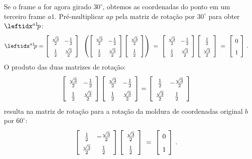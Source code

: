 Se o frame $a$ for agora girado $30^{\circ}$, obtemos as coordenadas do ponto em um terceiro frame $a1$. Pré-multiplicar $ap$ pela matriz de rotação por $30^{\circ}$ para obter $\aprimep$:
\[
\spacearray
\aprimep = \left[\begin{array}{cc}\frac{\sqrt{3}}{2}&-\frac{1}{2}\\\frac{1}{2}&\frac{\sqrt{3}}{2}\end{array}\right]\;\;
\left(\left[\begin{array}{cc}\frac{\sqrt{3}}{2}&-\frac{1}{2}\\\frac{1}{2}&\frac{\sqrt{3}}{2}\end{array}\right]
\left[\begin{array}{c}\frac{\sqrt{3}}{2}\\\frac{1}{2}\end{array}\right]\right)\;=\;
\left[\begin{array}{cc}\frac{\sqrt{3}}{2}&-\frac{1}{2}\\\frac{1}{2}&\frac{\sqrt{3}}{2}\end{array}\right]
\left[\begin{array}{c}\frac{1}{2}\\\frac{\sqrt{3}}{2}\end{array}\right]\;=\;
\left[\begin{array}{c}0\\1\end{array}\right]\,.
\]
O produto das duas matrizes de rotação:
\[
\spacearray
\left[\begin{array}{cc}\frac{\sqrt{3}}{2}&-\frac{1}{2}\\\frac{1}{2}&\frac{\sqrt{3}}{2}\end{array}\right]
\left[\begin{array}{cc}\frac{\sqrt{3}}{2}&-\frac{1}{2}\\\frac{1}{2}&\frac{\sqrt{3}}{2}\end{array}\right]=
\left[\begin{array}{cc}\frac{1}{2}&-\frac{\sqrt{3}}{2}\\\frac{\sqrt{3}}{2}&\frac{1}{2}\end{array}\right]
\]
resulta na matriz de rotação para a rotação da moldura de coordenadas original $b$ por $60^{\circ}$:
\[
\spacearray
\left[\begin{array}{cc}\frac{1}{2}&-\frac{\sqrt{3}}{2}\\\frac{\sqrt{3}}{2}&\frac{1}{2}\end{array}\right]
\left[\begin{array}{c}\frac{\sqrt{3}}{2}\\\frac{1}{2}\end{array}\right]\;=\;
\left[\begin{array}{c}0\\1\end{array}\right]\,.
\]

